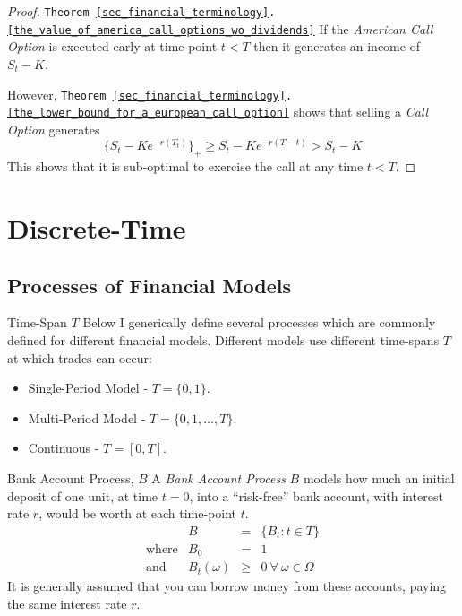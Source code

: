 \documentclass[11pt,a4paper]{article}
\begin{document}
  \begin{proof}{\texttt{Theorem \ref{sec_financial_terminology}.\ref{the_value_of_america_call_options_wo_dividends}}}
    If the \textit{American Call Option} is executed early at time-point $t<T$ then it generates an income of $S_t-K$.
    \par However, \texttt{Theorem \ref{sec_financial_terminology}.\ref{the_lower_bound_for_a_european_call_option}} shows that selling a \textit{Call Option} generates
    \[ \{S_t-Ke^{-r(T_t)}\}_+\geq S_t-Ke^{-r(T-t)}>S_t-K \]
    This shows that it is sub-optimal to exercise the call at any time $t<T$.
  \end{proof}

\section{Discrete-Time}\label{sec_discrete_time_models}

\subsection{Processes of Financial Models}\label{sec_processes_of_models}

  \begin{remark}{Time-Span $T$}
    Below I generically define several processes which are commonly defined for different financial models. Different models use different time-spans $T$ at which trades can occur:
    \begin{itemize}
      \item Single-Period Model - $T=\{0,1\}$.
      \item Multi-Period Model - $T=\{0,1,\dots,T\}$.
      \item Continuous - $T=[0,T]$.
    \end{itemize}
  \end{remark}

  \begin{definition}{Bank Account Process, $B$}\label{def_bank_account_process}
    A \textit{Bank Account Process} $B$ models how much an initial deposit of one unit, at time $t=0$, into a ``risk-free'' bank account, with interest rate $r$, would be worth at each time-point $t$.
    \[\begin{array}{rrcl}
      &B&=&\{B_t:t\in T\}\\
      \text{where}&B_0&=&1\\
      \text{and}&B_t(\omega)&\geq&0\ \forall\ \omega\in\Omega
    \end{array}\]
    It is generally assumed that you can borrow money from these accounts, paying the same interest rate $r$.
  \end{definition}
\end{document}
